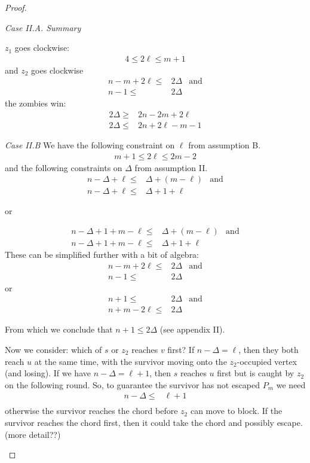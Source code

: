 \begin{proof}
\begin{proofpart}
  \textit{Case II.A. Summary}

  $z_1$ goes clockwise:
  \begin{align*}
   4 \leq 2 \ell \leq m + 1
  \end{align*}
  and $z_2$ goes clockwise
  \begin{align*}
   n -m + 2\ell \leq & 2 \Delta & \text{and} \\
   n-1 \leq          & 2 \Delta
  \end{align*}
  the zombies win:
  \begin{align*}
   2 \Delta \geq & 2n - 2m + 2\ell    \\
   2 \Delta \leq & 2n + 2\ell - m - 1
  \end{align*}

  \textit{Case II.B}  We have the following constraint on $\ell$ from
  assumption B.
  \begin{align*}
   m + 1 \leq 2 \ell \leq 2m - 2
  \end{align*}
  and the following constraints on $\Delta$ from assumption II.
  \begin{align*}
   n - \Delta + \ell \leq & \Delta + (m - \ell) & \text{and} \\
   n - \Delta + \ell \leq & \Delta + 1 + \ell
  \end{align*}
  \begin{center}or\end{center}
  \begin{align*}
   n - \Delta + 1 + m - \ell \leq & \Delta + (m - \ell) & \text{and} \\
   n - \Delta + 1 + m - \ell \leq & \Delta + 1 + \ell
  \end{align*}
  These can be simplified further with a bit of algebra:
  \begin{align*}
   n-m+2\ell \leq & 2 \Delta & \text{and} \\
   n-1 \leq       & 2\Delta
  \end{align*}
  or
  \begin{align*}
   n+1 \leq        & 2 \Delta & \text{and} \\
   n+m-2\ell  \leq & 2 \Delta
  \end{align*}

  From which we conclude that $n+1 \leq 2 \Delta$ (see appendix II).

  Now we consider: which of $s$ or $z_2$ reaches $v$ first?
  If $n - \Delta = \ell$, then they both reach $u$ at the same time,
  with the survivor moving onto the $z_2$-occupied vertex (and losing).
  If we have $n - \Delta = \ell + 1$, then $s$ reaches $u$ first
  but is caught by $z_2$ on the following round.
  So, to guarantee the survivor has not escaped $P_m$ we need
  \begin{align*}
   n - \Delta \leq & \ell + 1 \\
  \end{align*}
  otherwise the survivor reaches the chord before $z_2$ can move
  to block. If the survivor reaches the chord first, then it could
  take the chord and possibly escape. (more detail??)


\end{proofpart}
\end{proof}

